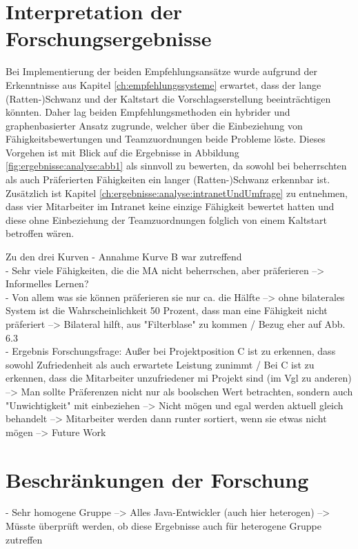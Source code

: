 \section{Interpretation der Forschungsergebnisse}
\label{ch:diskussion:interpretation}
Bei Implementierung der beiden Empfehlungsansätze wurde aufgrund der Erkenntnisse aus Kapitel \ref{ch:empfehlungssysteme} erwartet, dass der lange (Ratten-)Schwanz und der Kaltstart die Vorschlagserstellung beeinträchtigen könnten. Daher lag beiden Empfehlungsmethoden ein hybrider und graphenbasierter Ansatz zugrunde, welcher über die Einbeziehung von Fähigkeitsbewertungen und Teamzuordnungen beide Probleme löste. Dieses Vorgehen ist mit Blick auf die Ergebnisse in Abbildung \ref{fig:ergebnisse:analyse:abb1} als sinnvoll zu bewerten, da sowohl bei beherrschten als auch Präferierten Fähigkeiten ein langer (Ratten-)Schwanz erkennbar ist. Zusätzlich ist Kapitel \ref{ch:ergebnisse:analyse:intranetUndUmfrage} zu entnehmen, dass vier Mitarbeiter im Intranet keine einzige Fähigkeit bewertet hatten und diese ohne Einbeziehung der Teamzuordnungen folglich von einem Kaltstart betroffen wären.

Zu den drei Kurven
\newpage
- Annahme Kurve B war zutreffend\\
- Sehr viele Fähigkeiten, die die MA nicht beherrschen, aber präferieren --> Informelles Lernen?\\
- Von allem was sie können präferieren sie nur ca. die Hälfte --> ohne bilaterales System ist die Wahrscheinlichkeit 50 Prozent, dass man eine Fähigkeit nicht präferiert --> Bilateral hilft, aus "Filterblase" zu kommen / Bezug eher auf Abb. 6.3\\
- Ergebnis Forschungsfrage: Außer bei Projektposition C ist zu erkennen, dass sowohl Zufriedenheit als auch erwartete Leistung zunimmt / Bei C ist zu erkennen, dass die Mitarbeiter unzufriedener mi Projekt sind (im Vgl zu anderen) --> Man sollte Präferenzen nicht nur als boolschen Wert betrachten, sondern auch "Unwichtigkeit" mit einbeziehen --> Nicht mögen und egal werden aktuell gleich behandelt --> Mitarbeiter werden dann runter sortiert, wenn sie etwas nicht mögen --> Future Work

\section{Beschränkungen der Forschung}
\label{ch:diskussion:beschraenkungen}
- Sehr homogene Gruppe --> Alles Java-Entwickler (auch hier heterogen) --> Müsste überprüft werden, ob diese Ergebnisse auch für heterogene Gruppe zutreffen

